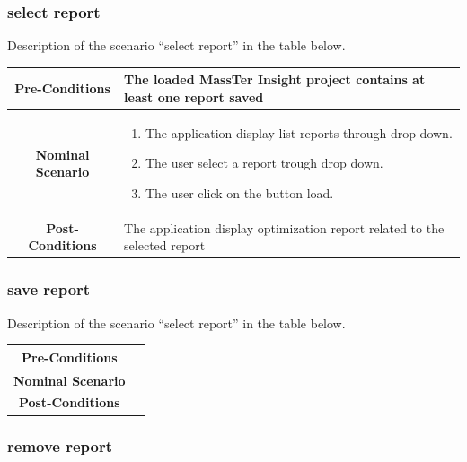 \documentclass[12pt]{article}
\begin{document}
 \clearpage
 \newpage
 
 	 \subsubsection{select report}

 Description of the scenario ``select report'' in the table below.
 
 \begin{table}
 	\centering
 	\begin{tabular}{|c|p{10cm}|}
 		\hline 	
 		\textbf{Pre-Conditions } & The loaded MassTer Insight project contains at least one report saved\\ 
 		\hline                     
 		\textbf{Nominal Scenario } &
 		\begin{enumerate}
 			\item The application display list reports through drop down.
 			\item The user select a report trough drop down.
 			\item The user click on the button load.   
 		\end{enumerate} \\ 
 		\hline 
 		\textbf{Post-Conditions} & The application display optimization report related to the selected report \\
 		\hline 
 	\end{tabular}
 \end{table}
 \clearpage
 \newpage
  	 \subsubsection{save report}
 
 Description of the scenario ``select report'' in the table below.
 
 \begin{table}
 	\centering
 	\begin{tabular}{|c|p{10cm}|}
 		\hline 	
 		\textbf{Pre-Conditions } & \\ 
 		\hline                     
 		\textbf{Nominal Scenario } & \\ 
 		\hline 
 		\textbf{Post-Conditions} &  \\
 		\hline 
 	\end{tabular}
 \end{table}
 \clearpage
 \newpage
   	 \subsubsection{remove report}
 
\end{document}
